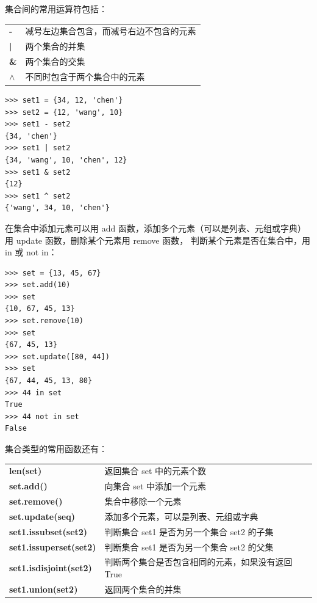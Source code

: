集合间的常用运算符包括：

\begin{center}
\begin{tcolorbox} [title = 集合间的常用运算符]
  \bf
  \begin{tcboutputlisting}
  \begin{tabular}{>{\bfseries}ll}
    - &减号左边集合包含，而减号右边不包含的元素\\
    | &两个集合的并集\\
    \& & 两个集合的交集\\
    $\land$ & 不同时包含于两个集合中的元素\\
  \end{tabular}
\end{tcboutputlisting}
\end{tcolorbox}
\end{center}

\begin{lstlisting}[Language=Python]
>>> set1 = {34, 12, 'chen'}
>>> set2 = {12, 'wang', 10}
>>> set1 - set2
{34, 'chen'}
>>> set1 | set2
{34, 'wang', 10, 'chen', 12}
>>> set1 & set2
{12}
>>> set1 ^ set2
{'wang', 34, 10, 'chen'}
\end{lstlisting}

在集合中添加元素可以用 add 函数，添加多个元素（可以是列表、元组或字典）用 update 函数，删除某个元素用 remove 函数， 判断某个元素是否在集合中，用 in 或 not in：

\begin{lstlisting}[Language=Python]
>>> set = {13, 45, 67}
>>> set.add(10)
>>> set
{10, 67, 45, 13}
>>> set.remove(10)
>>> set
{67, 45, 13}
>>> set.update([80, 44])
>>> set
{67, 44, 45, 13, 80}
>>> 44 in set
True
>>> 44 not in set
False
\end{lstlisting}

集合类型的常用函数还有：
\begin{center}
\begin{tcolorbox} [title = 集合类型的一些处理函数]
  \bf
  \begin{tcboutputlisting}
  \begin{tabular}{>{\bfseries}ll}
    len(set) &返回集合 set 中的元素个数\\
    set.add() &向集合 set 中添加一个元素\\
    set.remove() & 集合中移除一个元素\\
    set.update(seq) & 添加多个元素，可以是列表、元组或字典\\
  set1.issubset(set2)  & 判断集合 set1 是否为另一个集合 set2 的子集\\
  set1.issuperset(set2)  & 判断集合 set1 是否为另一个集合 set2 的父集\\
  set1.isdisjoint(set2) & 判断两个集合是否包含相同的元素，如果没有返回 True\\
  set1.union(set2) & 返回两个集合的并集
  \end{tabular}
\end{tcboutputlisting}
\end{tcolorbox}
\end{center}

